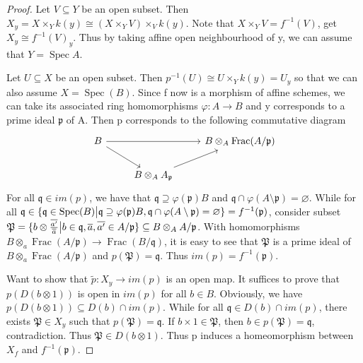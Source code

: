 \documentclass{ctexart}
\newcommand{\spec}{\operatorname{Spec}}
\newcommand{\fraction}{\operatorname{Frac}}
\begin{document}
\begin{proof}
    Let $V \subseteq Y$ be an open subset.
    Then $X_{y} = X \times_{Y} k(y) \cong (X \times_{Y} V) \times_{V} k(y)$.
    Note that $X \times_{Y} V = f^{-1}(V)$, get $X_{y} \cong f^{-1}(V)_{y}$.
    Thus by taking affine open neighbourhood of y, we can assume that $Y = \spec A$.
    \par
    Let $U \subseteq X$ be an open subset.
    Then $p^{-1}(U) \cong U \times_{Y} k(y) = U_{y}$ so that we can also assume $X = \spec(B)$.
    Since f now is a morphism of affine schemes, we can take its associated ring homomorphisms $\varphi: A \longrightarrow B$ and y corresponds to a prime ideal $\mathfrak{p}$ of A.
    Then p corresponds to the following commutative diagram
    \begin{equation*}
        \begin{tikzcd}
            B \arrow[rr] \arrow[dr] &&
            B \otimes_{A} \fraction(A/\mathfrak{p}) \\
            & B \otimes_{A} A_{\mathfrak{p}} \arrow[ur] &
        \end{tikzcd}
    \end{equation*}
    For all $\mathfrak{q}\in im(p)$, we have that $\mathfrak{q}\supseteq \varphi(\mathfrak{p})B$ and $\mathfrak{q} \cap \varphi(A \setminus \mathfrak{p}) = \varnothing$.
    While for all $\mathfrak{q}\in \{\mathfrak{q}\in \spec(B) \big{|} \mathfrak{q}\supseteq \varphi(\mathfrak{p})B, \mathfrak{q} \cap \varphi(A \setminus \mathfrak{p}) = \varnothing\} = f^{-1}(\mathfrak{p})$,
    consider subset $\mathfrak{P} = \{b \otimes \frac{\overline{a'}}{\overline{a}} \big{|} b\in \mathfrak{q}, \overline{a},\overline{a'}\in A/\mathfrak{p}\} \subseteq B \otimes_{A} A/\mathfrak{p}$.
    With homomorphisms $B \otimes_{a} \fraction(A/\mathfrak{p}) \longrightarrow \fraction(B/\mathfrak{q})$, it is easy to see that $\mathfrak{P}$ is a prime ideal of $B \otimes_{a} \fraction(A/\mathfrak{p})$ and $p(\mathfrak{P}) = \mathfrak{q}$.
    Thus $im(p) = f^{-1}(\mathfrak{p})$.
    \par
    Want to show that $\widetilde{p}: X_{y} \longrightarrow im(p)$ is an open map.
    It suffices to prove that $p(D(b \otimes 1))$ is open in $im(p)$ for all $b\in B$.
    Obviously, we have $p(D(b \otimes 1)) \subseteq D(b) \cap im(p)$.
    While for all $\mathfrak{q}\in D(b) \cap im(p)$, there exists $\mathfrak{P}\in X_{y}$ such that $p(\mathfrak{P}) = \mathfrak{q}$.
    If $b \times 1\in \mathfrak{P}$, then $b\in p(\mathfrak{P}) = \mathfrak{q}$, contradiction.
    Thus $\mathfrak{P}\in D(b \otimes 1)$. 
    Thus p induces a homeomorphism between $X_{f}$ and $f^{-1}(\mathfrak{p})$.
\end{proof}
\end{document}
